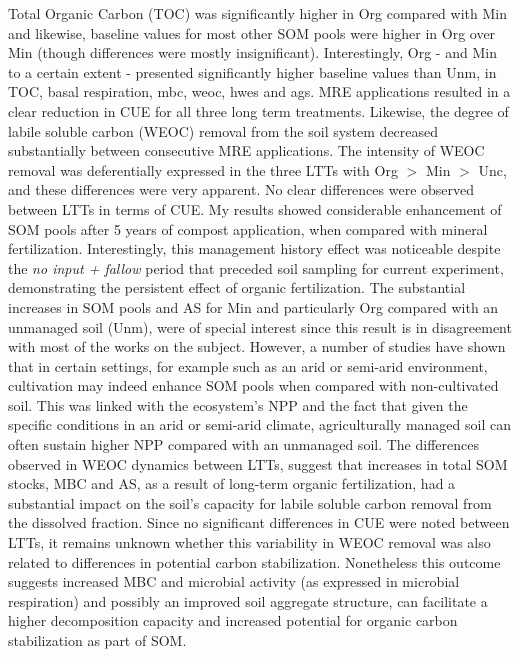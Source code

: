 	Total Organic Carbon (TOC) was significantly higher in Org compared with Min and likewise, baseline values  for most other SOM pools were higher in Org over Min (though differences were mostly insignificant). Interestingly, Org - and Min to a certain extent - presented significantly higher baseline values than Unm, in TOC, basal respiration, \gls{mbc}, \gls{weoc}, \gls{hwes} and \gls{ags}. 
	MRE applications resulted in a clear reduction in CUE for all three long term treatments. Likewise, the degree of labile soluble carbon (WEOC) removal from the soil system decreased substantially between consecutive MRE applications. The intensity of WEOC removal was deferentially expressed in the three LTTs with Org $  > $ Min $ > $ Unc, and these differences were very apparent. No clear differences were observed between LTTs in terms of CUE.
	My results showed considerable enhancement of SOM pools after 5 years of compost application, when compared with mineral fertilization. Interestingly, this management history effect was noticeable despite the \textit{no input + fallow} period that preceded soil sampling for current experiment, demonstrating the persistent effect of organic fertilization. The substantial increases in SOM pools and AS for Min and particularly Org compared with an unmanaged soil (Unm), were of special interest since this result is in disagreement with most of the works on the subject. However, a number of studies have shown that in certain settings, for example such as an arid or semi-arid environment, cultivation may indeed enhance SOM pools when compared with non-cultivated soil. This was linked with the ecosystem's NPP and the fact that given the specific conditions in an arid or semi-arid climate, agriculturally managed soil can often sustain higher NPP compared with an unmanaged soil.
	The differences observed in WEOC dynamics between LTTs, suggest that increases in total SOM stocks, MBC and AS, as a result of long-term organic fertilization, had a substantial impact on the soil's capacity for labile soluble carbon removal from the dissolved fraction. Since no significant differences in CUE were noted between LTTs, it remains unknown whether this variability in WEOC removal was also related to differences in potential carbon stabilization. Nonetheless this outcome suggests increased MBC and microbial activity (as expressed in microbial respiration) and possibly an improved soil aggregate structure, can facilitate a higher decomposition capacity and increased potential for organic carbon stabilization as part of SOM.
